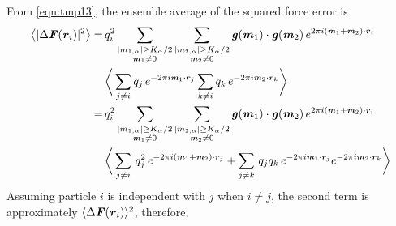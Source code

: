 \documentclass[aps,pre,preprint]{revtex4}
\renewcommand{\v}[1]{\textbf{\textit{#1}}}
\begin{document}
From \eqref{eqn:tmp13}, the ensemble average of the squared force error is
\begin{align}\nonumber
  \big\langle
  \vert\Delta\v F(\v r_i)\vert^2
  \big\rangle
  = \,&
  q^2_i
  \sum_{
    \begin{subarray}{c}
      \vert m_{1,\alpha}\vert \geq K_\alpha/2\\
      \v m_1\neq 0
    \end{subarray}}
  \sum_{
    \begin{subarray}{c}
      \vert m_{2,\alpha}\vert \geq K_\alpha/2\\
      \v m_2\neq 0
    \end{subarray}}
  \v g(\v m_1)\cdot\v g(\v m_2) \,
  e^{2\pi i(\v m_1 + \v m_2)\cdot\v r_i} \\ \nonumber
  &
  \bigg\langle
  \sum_{j\neq i}q_j\,e^{-2\pi i\v m_1\cdot\v r_j}  
  \sum_{k\neq i}q_k\,e^{-2\pi i\v m_2\cdot\v r_k}
  \bigg\rangle\\ \nonumber
  = \,&
  q^2_i
  \sum_{
    \begin{subarray}{c}
      \vert m_{1,\alpha}\vert \geq K_\alpha/2\\
      \v m_1\neq 0
    \end{subarray}}
  \sum_{
    \begin{subarray}{c}
      \vert m_{2,\alpha}\vert \geq K_\alpha/2\\
      \v m_2\neq 0
    \end{subarray}}
  \v g(\v m_1)\cdot\v g(\v m_2) \,
  e^{2\pi i(\v m_1 + \v m_2)\cdot\v r_i}\\\nonumber
  &
  \bigg\langle
  \sum_{j\neq i}\,q_j^2\,e^{-2\pi i(\v m_1 + \v m_2)\cdot\v r_j} +
  \sum_{j\neq k}\,q_jq_k\, e^{-2\pi i\v m_1\cdot\v r_j} e^{-2\pi i\v m_2\cdot\v r_k}
  \bigg\rangle
\end{align}
Assuming particle $i$ is independent with $j$ when $i\neq j$, the second term is
approximately $\langle\Delta\v F(\v r_i)\rangle^2$, therefore,
\end{document}

